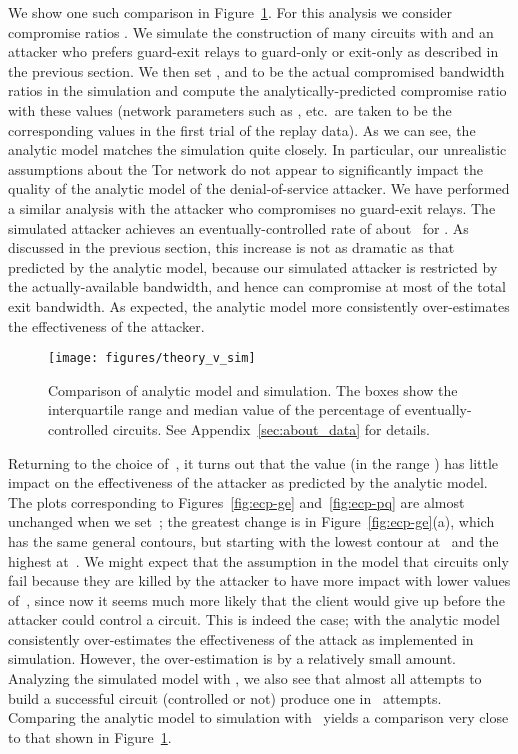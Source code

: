 \documentclass[]{lmcs}
\begin{document}
We show one such comparison in Figure~\ref{fig:theory_v_sim}.  For
this analysis we consider compromise ratios .  
We simulate the construction of many circuits with
 and an attacker who prefers guard-exit relays to guard-only
or exit-only as described in the previous section.
We then set ,  and  to be the actual compromised
bandwidth ratios in the simulation and compute the analytically-predicted
compromise ratio with these values (network parameters such as , etc.\ 
are taken to be the corresponding values in the first trial of the
replay data).
As we can see, the analytic model matches the simulation quite closely.
In particular, our unrealistic assumptions about the Tor network
do not appear to significantly impact the quality of the analytic
model of the denial-of-service attacker.
We have performed a similar analysis with the attacker who compromises
no guard-exit relays.  The simulated attacker achieves an
eventually-controlled rate of about~ for .  As discussed
in the previous section, this increase is not as dramatic as that
predicted by the analytic model, because our simulated attacker is
restricted by the actually-available bandwidth, and hence can
compromise at most  of the total exit bandwidth.
As expected, the analytic model more consistently
over-estimates the effectiveness of the attacker.
\begin{figure}
\begin{center}
\texttt{[image: figures/theory\_v\_sim]}
\end{center}
\caption{Comparison of analytic model and simulation.  The boxes show the
interquartile range and median value of the percentage of eventually-controlled
circuits.  See Appendix~\ref{sec:about_data} for details.}
\label{fig:theory_v_sim}
\end{figure}

Returning to the choice of~, it turns out that the value (in the
range ) has little impact on the effectiveness of the
attacker as predicted by the analytic model.
The plots corresponding to
Figures~\ref{fig:ecp-ge} and~\ref{fig:ecp-pq} are almost unchanged
when we set~;
the greatest change is in Figure~\ref{fig:ecp-ge}(a), which has the
same general contours, but starting with the lowest contour at~
and the highest at~.  We might expect that the assumption in
the model that circuits only fail because they are killed by the
attacker to have more impact with lower values of~, since now
it seems much more likely that the client would give up before the
attacker could control a circuit.  This is indeed the case; with
 the analytic model consistently over-estimates the effectiveness
of the attack as implemented in simulation.  However, the over-estimation
is by a relatively small amount.  Analyzing the simulated model with
, we also see that almost all attempts to build a successful
circuit (controlled or not) produce one in~ attempts.  
Comparing the analytic model to simulation with~ yields a
comparison very close to that shown in Figure~\ref{fig:theory_v_sim}.
\end{document}
